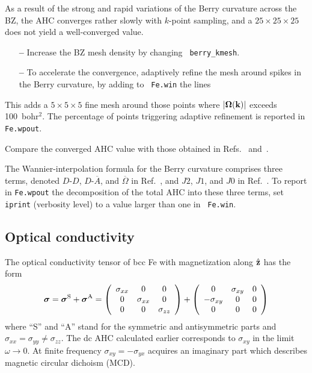 \documentclass[a4paper,11pt,twoside]{article}
\begin{document}
As a result of the strong and rapid variations of the Berry curvature
across the BZ, the AHC converges rather slowly with $k$-point
sampling, and a $25\times 25\times 25$ does not yield a well-converged
value.

  \begin{itemize}

  \item[{\bf --}] Increase the BZ mesh density by changing {\tt
      berry\_kmesh}.

  \item[{\bf --}] To accelerate the convergence, adaptively refine the
    mesh around spikes in the Berry curvature, by adding to {\tt
      Fe.win} the lines 

  \end{itemize}
    
    This adds a $5\times 5\times 5$ fine mesh around those points
    where $\vert{\bm \Omega}({\bf k})\vert$ exceeds 100~bohr$^2$. The
    percentage of points triggering adaptive refinement is reported in
    {\tt Fe.wpout}.

    Compare the converged AHC value with those obtained in
    Refs.~\cite{wang-prb06} and~\cite{yao-prl04}.

    The Wannier-interpolation formula for the Berry curvature
    comprises three terms, denoted $D$-$D$, $D$-$\overline{A}$, and
    $\overline{\Omega}$ in Ref.~\cite{wang-prb06}, and $J2$, $J1$, and
    $J0$ in Ref.~\cite{lopez-prb12}.  To report in {\tt Fe.wpout} the
    decomposition of the total AHC into these three terms, set {\tt
      iprint} (verbosity level) to a value larger than one in {\tt
      Fe.win}.

\subsection*{Optical conductivity}

The optical conductivity tensor of bcc Fe with magnetization along
$\hat{\bf z}$ has the form
%
$$
\bm{\sigma}=\bm{\sigma}^{\rm S}+\bm{\sigma}^{\rm A}=
\left(
\begin{array}{ccc}
\sigma_{xx} & 0 & 0\\
0 & \sigma_{xx} & 0\\
0 & 0 & \sigma_{zz}
\end{array}
\right)+
\left(
\begin{array}{ccc}
0 & \sigma_{xy} & 0 \\
-\sigma_{xy} & 0 & 0\\
0 & 0 & 0
\end{array}
\right)$$
%
where ``S'' and ``A'' stand for the symmetric and antisymmetric parts
and $\sigma_{xx}=\sigma_{yy}\not=\sigma_{zz}$. The dc AHC calculated
earlier corresponds to $\sigma_{xy}$ in the limit $\omega\rightarrow
0$. At finite frequency $\sigma_{xy}=-\sigma_{yx}$ acquires an
imaginary part which describes magnetic circular dichoism (MCD).
\end{document}
